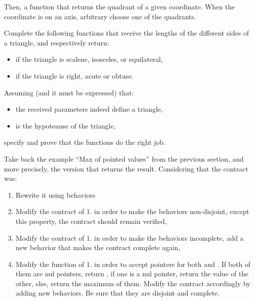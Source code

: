

Then, a function that returns the quadrant of a given coordinate. When
the coordinate is on an axis, arbitrary choose one of the quadrants.






Complete the following functions that receive the lengths of the different
sides of a triangle, and respectively return:

\begin{itemize}
\item if the triangle is scalene, isosceles, or equilateral,
\item if the triangle is right, acute or obtuse.
\end{itemize}




Assuming (and it must be expressed) that:


\begin{itemize}
\item the received parameters indeed define a triangle,
\item {} is the hypotenuse of the triangle,
\end{itemize}


specify and prove that the functions do the right job.




Take back the example ``Max of pointed values'' from the previous section,
and more precisely, the version that returns the result. Considering that
the contract was:






\begin{enumerate}
\item Rewrite it using behaviors
\item Modify the contract of 1. in order to make the behaviors non-disjoint,
  except this property, the contract should remain verified,
\item Modify the contract of 1. in order to make the behaviors incomplete,
  add a new behavior that makes the contract complete again,
\item Modify the function of 1. in order to accept  pointers
  for both  and . If both of them are nul pointers,
  return , if one is a nul pointer, return the value of
  the other, else, return the maximum of them. Modify the contract accordingly
  by adding new behaviors. Be sure that they are disjoint and complete.
\end{enumerate}


